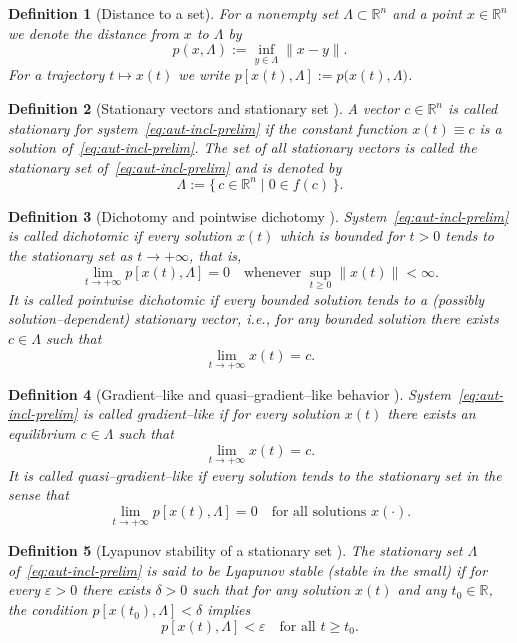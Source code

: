 \documentclass[journal]{IEEEtran}
\newtheorem{definition}{Definition}
\begin{document}
\begin{definition}[Distance to a set]
For a nonempty set $\Lambda\subset\mathbb{R}^n$ and a point $x\in\mathbb{R}^n$
we denote the distance from $x$ to $\Lambda$ by
\[
  p(x,\Lambda) := \inf_{y\in\Lambda} \|x-y\|.
\]
For a trajectory $t\mapsto x(t)$ we write
$p[x(t),\Lambda] := p\bigl(x(t),\Lambda\bigr)$.
\end{definition}

\begin{definition}[Stationary vectors and stationary set {\cite[Def.~1.7]{YLG}}]
A vector $c\in\mathbb{R}^n$ is called \emph{stationary} for
system~\eqref{eq:aut-incl-prelim} if the constant function
$x(t)\equiv c$ is a solution of~\eqref{eq:aut-incl-prelim}.
The set of all stationary vectors is called the \emph{stationary set}
of~\eqref{eq:aut-incl-prelim} and is denoted by
\[
  \Lambda := \{\,c\in\mathbb{R}^n \mid 0\in f(c)\,\}.
\]
\end{definition}

\begin{definition}[Dichotomy and pointwise dichotomy {\cite[Defs.~1.8--1.9]{YLG}}]
System~\eqref{eq:aut-incl-prelim} is called
\emph{dichotomic} if every solution $x(t)$ which is bounded for $t>0$
tends to the stationary set as $t\to+\infty$, that is,
\[
   \lim_{t\to+\infty} p[x(t),\Lambda] = 0
   \quad\text{whenever } \sup_{t\ge 0}\|x(t)\|<\infty.
\]
It is called \emph{pointwise dichotomic} if every bounded solution
tends to a (possibly solution–dependent) stationary vector,
i.e., for any bounded solution there exists $c\in\Lambda$ such that
\[
   \lim_{t\to+\infty} x(t) = c.
\]
\end{definition}

\begin{definition}[Gradient--like and quasi–gradient--like behavior
{\cite[Defs.~1.10--1.11]{YLG}}]
System~\eqref{eq:aut-incl-prelim} is called
\emph{gradient–like} if for every solution $x(t)$ there exists an
equilibrium $c\in\Lambda$ such that
\[
   \lim_{t\to+\infty} x(t) = c.
\]
It is called \emph{quasi–gradient–like} if every solution tends to the
stationary set in the sense that
\[
   \lim_{t\to+\infty} p[x(t),\Lambda] = 0
   \quad\text{for all solutions } x(\cdot).
\]
\end{definition}

\begin{definition}[Lyapunov stability of a stationary set {\cite[Def.~1.12]{YLG}}]
The stationary set $\Lambda$ of~\eqref{eq:aut-incl-prelim} is said to be
\emph{Lyapunov stable} (stable in the small) if for every $\varepsilon>0$
there exists $\delta>0$ such that for any solution $x(t)$ and any
$t_0\in\mathbb{R}$, the condition
$p[x(t_0),\Lambda]<\delta$ implies
\[
   p[x(t),\Lambda] < \varepsilon
   \quad\text{for all } t\ge t_0.
\]
\end{definition}
\end{document}
